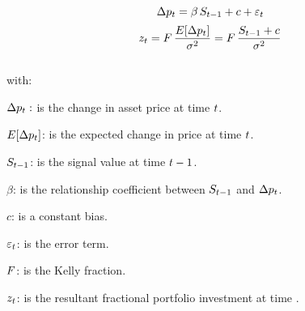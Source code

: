 \documentclass{article}
\begin{document}
\begin{equation}
\label{eqn:SignalRegression}
\Delta p_{t} = \beta \, S_{t-1} + c + \varepsilon_{t}
\end{equation}
\begin{equation}
\label{eqn:portfolioallocation}
    z_{t} = F \, \frac{E[\Delta p_{t}]}{\sigma^{2}} = F \, \frac{S_{t-1} + c}{\sigma^{2}}
\end{equation}
\\
with:

$\Delta p_{t}:$ is the change in asset price at time $t$.

$E[\Delta p_{t}]$: is the expected change in price at time $t$.

$S_{t-1}$: is the signal value at time $t-1$.

$\beta$: is the relationship coefficient between $S_{t-1}$ and $\Delta p_{t}$.

$c$: is a constant bias.

$\varepsilon_{t}$: is the error term.

$F$: is the Kelly fraction.

$z_{t}$: is the resultant fractional portfolio investment at time \currenttime.


\keyterms
\furtherlinks %
\end{document}
